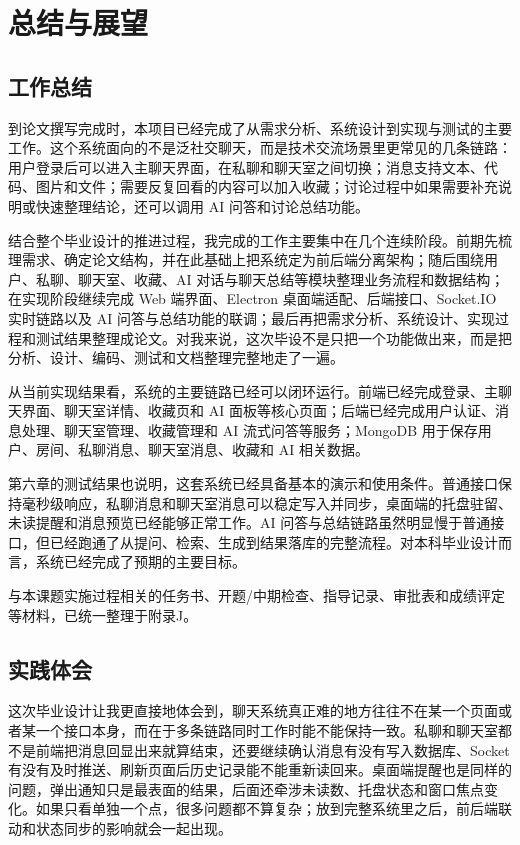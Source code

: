 \chapter{总结与展望}

\section{工作总结}

到论文撰写完成时，本项目已经完成了从需求分析、系统设计到实现与测试的主要工作。这个系统面向的不是泛社交聊天，而是技术交流场景里更常见的几条链路：用户登录后可以进入主聊天界面，在私聊和聊天室之间切换；消息支持文本、代码、图片和文件；需要反复回看的内容可以加入收藏；讨论过程中如果需要补充说明或快速整理结论，还可以调用 AI 问答和讨论总结功能。

结合整个毕业设计的推进过程，我完成的工作主要集中在几个连续阶段。前期先梳理需求、确定论文结构，并在此基础上把系统定为前后端分离架构；随后围绕用户、私聊、聊天室、收藏、AI 对话与聊天总结等模块整理业务流程和数据结构；在实现阶段继续完成 Web 端界面、Electron 桌面端适配、后端接口、Socket.IO 实时链路以及 AI 问答与总结功能的联调；最后再把需求分析、系统设计、实现过程和测试结果整理成论文。对我来说，这次毕设不是只把一个功能做出来，而是把分析、设计、编码、测试和文档整理完整地走了一遍。

从当前实现结果看，系统的主要链路已经可以闭环运行。前端已经完成登录、主聊天界面、聊天室详情、收藏页和 AI 面板等核心页面；后端已经完成用户认证、消息处理、聊天室管理、收藏管理和 AI 流式问答等服务；MongoDB 用于保存用户、房间、私聊消息、聊天室消息、收藏和 AI 相关数据。

第六章的测试结果也说明，这套系统已经具备基本的演示和使用条件。普通接口保持毫秒级响应，私聊消息和聊天室消息可以稳定写入并同步，桌面端的托盘驻留、未读提醒和消息预览已经能够正常工作。AI 问答与总结链路虽然明显慢于普通接口，但已经跑通了从提问、检索、生成到结果落库的完整流程。对本科毕业设计而言，系统已经完成了预期的主要目标。

与本课题实施过程相关的任务书、开题/中期检查、指导记录、审批表和成绩评定等材料，已统一整理于附录J。

\section{实践体会}

这次毕业设计让我更直接地体会到，聊天系统真正难的地方往往不在某一个页面或者某一个接口本身，而在于多条链路同时工作时能不能保持一致。私聊和聊天室都不是前端把消息回显出来就算结束，还要继续确认消息有没有写入数据库、Socket 有没有及时推送、刷新页面后历史记录能不能重新读回来。桌面端提醒也是同样的问题，弹出通知只是最表面的结果，后面还牵涉未读数、托盘状态和窗口焦点变化。如果只看单独一个点，很多问题都不算复杂；放到完整系统里之后，前后端联动和状态同步的影响就会一起出现。

